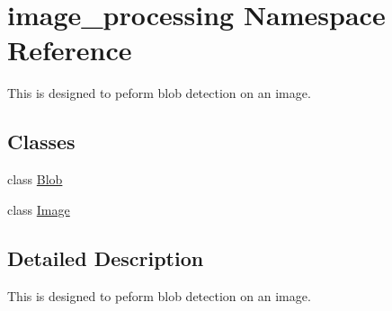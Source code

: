 \hypertarget{namespaceimage__processing}{}\section{image\+\_\+processing Namespace Reference}
\label{namespaceimage__processing}


This is designed to peform blob detection on an image.  


\subsection*{Classes}
\begin{DoxyCompactItemize}
\item 
class \hyperlink{classimage__processing_1_1Blob}{Blob}
\item 
class \hyperlink{classimage__processing_1_1Image}{Image}
\end{DoxyCompactItemize}


\subsection{Detailed Description}
This is designed to peform blob detection on an image. 